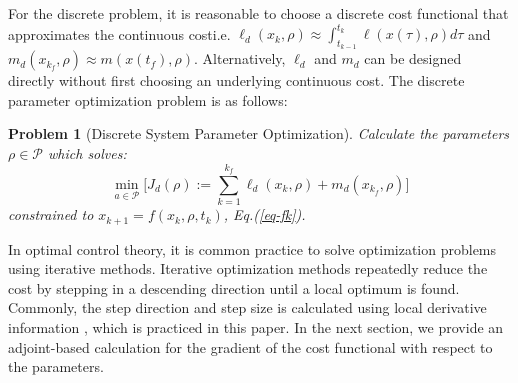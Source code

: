 \documentclass[letterpaper, 10pt, conference]{ieeeconf}
\newtheorem{problem}{Problem}
\begin{document}
For the discrete problem, it is reasonable to choose a discrete cost functional that approximates the continuous cost\textemdash i.e. $\ell_d(x_{k},\rho)\approx\int_{t_{k-1}}^{t_{k}}\ell(x(\tau),\rho)d\tau$ and $m_d(x_{k_f},\rho)\approx m(x(t_f),\rho)$.  Alternatively, $\ell_d$ and $m_d$ can be designed directly without first choosing an underlying continuous cost.  The discrete parameter optimization problem is as follows:
\begin{problem}[Discrete System Parameter Optimization]
Calculate the parameters $\rho\in\mathcal{P}$ which solves:
\[
\min_{a\in\mathcal{P}} \Big[J_d(\rho):=\sum_{k=1}^{k_f}\ell_d(x_k,\rho) + m_d(x_{k_f},\rho)\Big]
\]
constrained to $x_{k+1} = f(x_k,\rho,t_k)$, Eq.(\ref{eq-fk}).
\label{prob-disc}
\end{problem}

In optimal control theory, it is common practice to solve optimization problems using iterative methods.  Iterative optimization methods repeatedly reduce the cost by stepping in a descending direction until a local optimum is found.  Commonly, the step direction and step size is calculated using local derivative information \cite{armijo, kelley}, which is practiced in this paper.  In the next section, we provide an adjoint-based calculation for the gradient of the cost functional with respect to the parameters.
\end{document}
